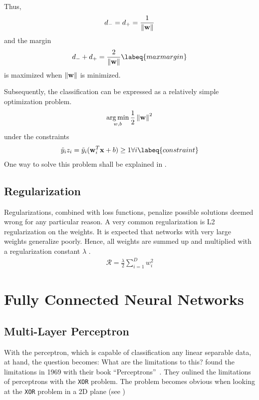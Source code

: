 Thus,
\begin{align}
    d_- = d_+ = \frac{1}{\left\lVert\mathbf{w}\right\rVert}
\end{align}
and the margin
\begin{align}
    d_- + d_+ = \frac{2}{\norm{\vec{w}}}
    \labeq{maxmargin}
\end{align}
is maximized when $\left\lVert\mathbf{w}\right\rVert$ is minimized.

Subsequently, the classification can be expressed as a relatively simple optimization problem.
\begin{align}
    \operatorname*{arg\,min}_{w, b} \frac{1}{2} \left\lVert\mathbf{w}\right\rVert^2
\end{align}
under the constraints
\begin{align}
    \tilde{y}_i z_i = \tilde{y}_i (\vec{w}_i^T \vec{x} + b) \geq 1 \forall i
    \labeq{constraint}
\end{align}
One way to solve this problem shall be explained in .

\subsection{Regularization}
Regularizations, combined with loss functions, penalize possible solutions deemed wrong for any particular reason.
A very common regularization is L2 regularization on the weights.
It is expected that networks with very large weights generalize poorly.
Hence, all weights are summed up and multiplied with a regularization constant $\lambda$ \cite{grosse}.
\begin{align}
	\mathcal{R} = \frac{\lambda}{2} \sum_{i = 1}^D w_i^2
\end{align}

\section{Fully Connected Neural Networks}
\subsection{Multi-Layer Perceptron}
With the perceptron, which is capable of classification any linear separable data, at hand, the question becomes: What are the limitations to this?
\citeauthor{perceptrons} found the limitations in 1969 with their book ``Perceptrons''~\cite{perceptrons}.
They oulined the limitations of perceptrons with the \lstinline|XOR| problem.
The problem becomes obvious when looking at the \lstinline|XOR| problem in a 2D plane (see )
\begin{marginfigure}
    \resizebox{\textwidth}{!}{
        
    }
    \caption[]{\lstinline|OR| and \lstinline|XOR| operations visualized. The \lstinline|XOR| problem cannot be solved by drawing a single line.}
\end{marginfigure}

